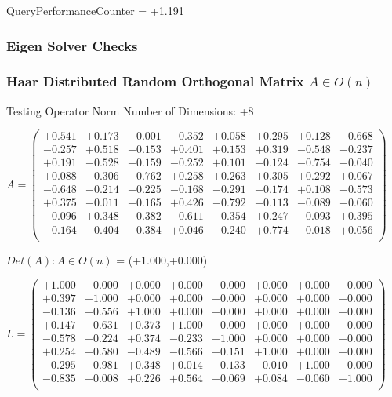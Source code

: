 \documentclass[9pt]{article}
\theoremstyle{plain}
\theoremstyle{definition}
\theoremstyle{remark}
\numberwithin{equation}{section}
\begin{document}
QueryPerformanceCounter  =  +1.191
\subsubsection{Eigen Solver Checks}
\subsubsection{Haar Distributed Random Orthogonal Matrix $A \in O(n)$}
 Testing Operator Norm
Number of Dimensions: +8

$A = \left(
\begin{array}{
cccccccc}
+0.541 & +0.173 & -0.001 & -0.352 & +0.058 & +0.295 & +0.128 & -0.668 \\
-0.257 & +0.518 & +0.153 & +0.401 & +0.153 & +0.319 & -0.548 & -0.237 \\
+0.191 & -0.528 & +0.159 & -0.252 & +0.101 & -0.124 & -0.754 & -0.040 \\
+0.088 & -0.306 & +0.762 & +0.258 & +0.263 & +0.305 & +0.292 & +0.067 \\
-0.648 & -0.214 & +0.225 & -0.168 & -0.291 & -0.174 & +0.108 & -0.573 \\
+0.375 & -0.011 & +0.165 & +0.426 & -0.792 & -0.113 & -0.089 & -0.060 \\
-0.096 & +0.348 & +0.382 & -0.611 & -0.354 & +0.247 & -0.093 & +0.395 \\
-0.164 & -0.404 & -0.384 & +0.046 & -0.240 & +0.774 & -0.018 & +0.056 \\
\end{array}
\right)$ \newline 

$Det(A) :   A \in O(n)$ = (+1.000,+0.000)

$L = \left(
\begin{array}{
cccccccc}
+1.000 & +0.000 & +0.000 & +0.000 & +0.000 & +0.000 & +0.000 & +0.000 \\
+0.397 & +1.000 & +0.000 & +0.000 & +0.000 & +0.000 & +0.000 & +0.000 \\
-0.136 & -0.556 & +1.000 & +0.000 & +0.000 & +0.000 & +0.000 & +0.000 \\
+0.147 & +0.631 & +0.373 & +1.000 & +0.000 & +0.000 & +0.000 & +0.000 \\
-0.578 & -0.224 & +0.374 & -0.233 & +1.000 & +0.000 & +0.000 & +0.000 \\
+0.254 & -0.580 & -0.489 & -0.566 & +0.151 & +1.000 & +0.000 & +0.000 \\
-0.295 & -0.981 & +0.348 & +0.014 & -0.133 & -0.010 & +1.000 & +0.000 \\
-0.835 & -0.008 & +0.226 & +0.564 & -0.069 & +0.084 & -0.060 & +1.000 \\
\end{array}
\right)$ \newline 
\end{document}
